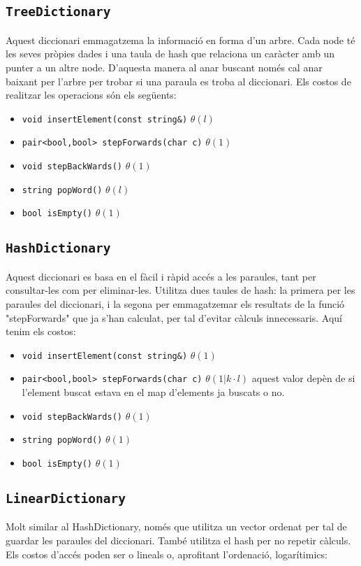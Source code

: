 ﻿\documentclass{article}
\begin{document}
\subsection{\texttt{TreeDictionary}}
Aquest diccionari emmagatzema la informació en forma d'un arbre. Cada node té les seves pròpies dades i una taula de hash que relaciona un caràcter amb un punter a un altre node. D'aquesta manera al anar buscant només cal anar baixant per l'arbre per trobar si una paraula es troba al diccionari. Els costos de realitzar les operacions són els següents:

\begin{itemize}
	\item \verb|void insertElement(const string&)| $\theta(l)$
	\item \verb|pair<bool,bool> stepForwards(char c)| $\theta(1)$
	\item \verb|void stepBackWards()| $\theta(1)$
	\item \verb|string popWord()| $\theta(l)$
	\item \verb|bool isEmpty()| $\theta(1)$
\end{itemize}

\subsection{\texttt{HashDictionary}}
Aquest diccionari es basa en el fàcil i ràpid accés a les paraules, tant per consultar-les com per eliminar-les. Utilitza dues taules de hash: la primera per les paraules del diccionari, i la segona per emmagatzemar els resultats de la funció "stepForwards" que ja s'han calculat, per tal d'evitar càlculs innecessaris. Aquí tenim els costos:

\begin{itemize}
	\item \verb|void insertElement(const string&)| $\theta(1)$
	\item \verb|pair<bool,bool> stepForwards(char c)| $\theta(1 | k·l)$ aquest valor depèn de si l'element buscat estava en el map d'elements ja buscats o no.
	\item \verb|void stepBackWards()| $\theta(1)$
	\item \verb|string popWord()| $\theta(1)$
	\item \verb|bool isEmpty()| $\theta(1)$
\end{itemize}

\subsection{\texttt{LinearDictionary}}
Molt similar al HashDictionary, només que utilitza un vector ordenat per tal de guardar les paraules del diccionari. També utilitza el hash per no repetir càlculs. Els costos d'accés poden ser o lineals o, aprofitant l'ordenació, logarítimics:
\end{document}
